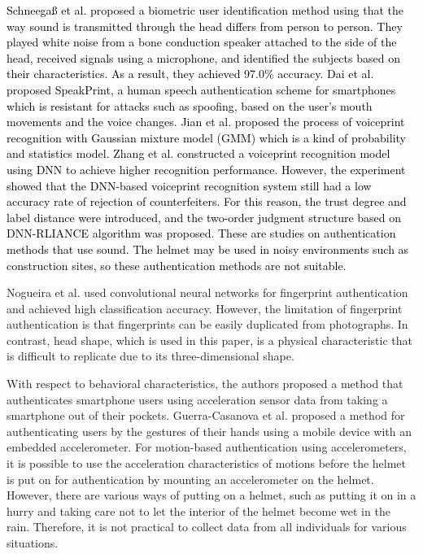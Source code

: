 \documentclass[english,preprint,JIP]{ipsj}
\begin{document}
\textcolor{black}{Schneegaß et al.\cite{skull_auth} proposed a biometric user identification method using that the way sound is transmitted through the head differs from person to person. They played white noise from a bone conduction speaker attached to the side of the head, received signals using a microphone, and identified the subjects based on their characteristics. As a result, they achieved 97.0\% accuracy. Dai et al.\cite{speech_auth} proposed SpeakPrint, a human speech authentication scheme for smartphones which is resistant for attacks such as spoofing, based on the user's mouth movements and the voice changes. Jian et al.\cite{voice_auth_GMM} proposed the process of voiceprint recognition with Gaussian mixture model (GMM) which is a kind of probability and statistics model. Zhang et al.\cite{voice_auth_DNN} constructed a voiceprint recognition model using DNN to achieve higher recognition performance. However, the experiment showed that the DNN-based voiceprint recognition system still had a low accuracy rate of rejection of counterfeiters. For this reason, the trust degree and label distance were introduced, and the two-order judgment structure based on DNN-RLIANCE algorithm was proposed. These are studies on authentication methods that use sound. The helmet may be used in noisy environments such as construction sites, so these authentication methods are not suitable.}\par

Nogueira et al.\cite{finger_CNN} used convolutional neural networks for fingerprint authentication and achieved high classification accuracy. However, the limitation of fingerprint authentication is that fingerprints can be easily duplicated from photographs. In contrast, head shape, which is used in this paper, is a physical characteristic that is difficult to replicate due to its three-dimensional shape.\par

With respect to behavioral characteristics, the authors proposed a method that authenticates smartphone users using acceleration sensor data from taking a smartphone out of their pockets\cite{murao_screen_unlock_blind}. Guerra-Casanova et al.\cite{accelerometer_authentification} proposed a method for authenticating users by the gestures of their hands using a mobile device with an embedded accelerometer. For motion-based authentication using accelerometers, it is possible to use the acceleration characteristics of motions before the helmet is put on for authentication by mounting an accelerometer on the helmet. However, there are various ways of putting on a helmet, such as putting it on in a hurry and taking care not to let the interior of the helmet become wet in the rain. Therefore, it is not practical to collect data from all individuals for various situations.
\end{document}
